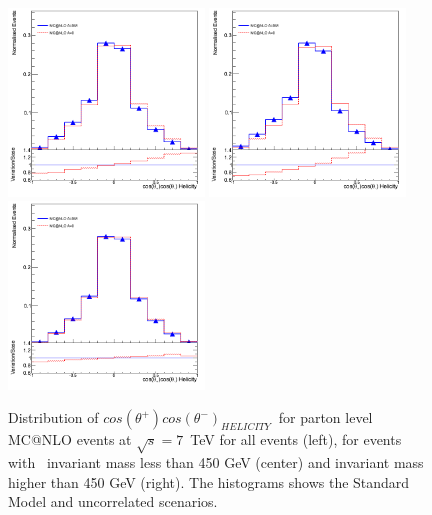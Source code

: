 \begin{figure}[htpb!]
\begin{center}
\includegraphics[width=52mm]{f/truth_coscos_hb_truth_comparison}
\includegraphics[width=52mm]{f/truth_coscos_hb_low_truth_comparison}
\includegraphics[width=52mm]{f/truth_coscos_hb_high_truth_comparison}
\end{center}
\caption{Distribution of $cos(\theta^{+})cos(\theta^{-})_{HELICITY}~$ for parton level MC@NLO events at $\sqrt{s}=7$~TeV for all events (left), for events with \ttbar\ invariant mass less than 450 GeV (center) and invariant mass higher than 450 GeV (right). The histograms shows the Standard Model and uncorrelated scenarios. }
\label{fig:coscoshb}
\end{figure} 

